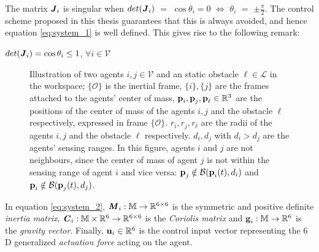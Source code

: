 The matrix $\bm{\mathit{J}}_i$ is singular when $det(\bm{\mathit{J}}_i)$ $=$ $\cos\theta_i = 0$
$\Leftrightarrow$ $\theta_i$ $=$ $\pm \frac{\pi}{2}$. The control scheme
proposed in this thesis guarantees that this is always avoided, and hence
equation \eqref{eq:system_1} is well defined. This gives rise to the following
remark:

\begin{bw_box}
  \begin{remark}
    $det(\bm{\mathit{J}}_i) = \cos\theta_i \leq 1$, $\forall i \in \mathcal{V}$
  \end{remark}
\end{bw_box}

\begin{figure}[ht!]
	\centering
    
    \caption{Illustration of two agents $i, j \in \mathcal{V}$ and an static
      obstacle $\ell \in \mathcal{L}$ in the workspace; $\{\mathcal{O}\}$ is the inertial
      frame, $\{i\}, \{j\}$ are the frames attached to the agents' center of
      mass, $\bm{\mathbf{p}}_i, \bm{\mathbf{p}}_j, \bm{\mathbf{p}}_{\ell} \in \mathbb{R}^3$ are the
      positions of the center of mass of the agents $i,j$ and the
      obstacle $\ell$ respectively, expressed in frame
      $\{\mathcal{O}\}$. $r_i, r_j, r_{\ell}$ are the radii of the agents $i,j$
      and the obstacle $\ell$ respectively. $d_i, d_j$ with
      $d_i > d_j$ are the agents' sensing ranges.
      In this figure, agents $i$ and $j$ are not neighbours, since the center
      of mass of agent $j$ is not within the sensing range of agent $i$ and vice
      versa: $\bm{\mathbf{p}}_j \notin \mathcal{B}(\bm{\mathbf{p}}_i(t), d_i)$ and
      $\bm{\mathbf{p}}_i \notin \mathcal{B}(\bm{\mathbf{p}}_j(t), d_j)$.}
	\label{fig:two_agents_one_obstacle}
\end{figure}

In equation \eqref{eq:system_2}, $\bm{\mathit{M}}_i:\mathbb{M} \to \mathbb{R}^{6\times6}$ is
the symmetric and positive definite \textit{inertia matrix},
$\bm{\mathit{C}}_i:\mathbb{M}\times\mathbb{R}^6 \to \mathbb{R}^{6\times6}$ is the
\textit{Coriolis matrix} and $\bm{\mathbf{g}}_i:\mathbb{M} \to \mathbb{R}^6$ is the
\textit{gravity vector}.
Finally, $\bm{\mathbf{u}}_i\in\mathbb{R}^6$ is the control input vector representing
the $6$D generalized \textit{actuation force} acting on the agent.



